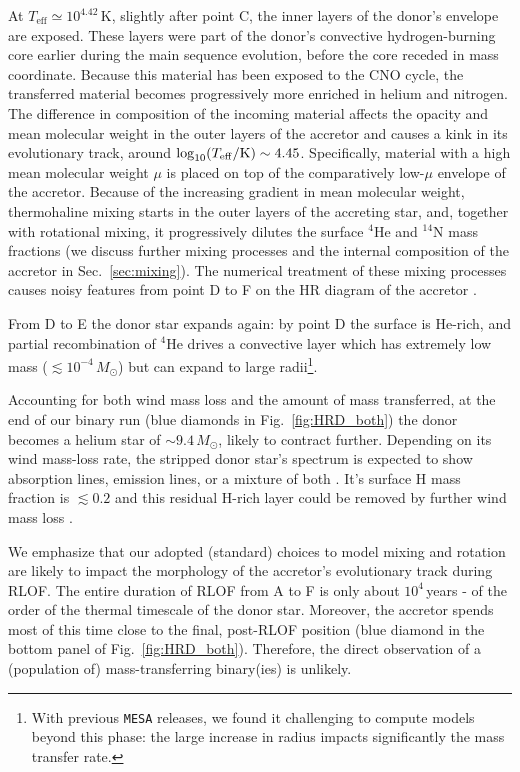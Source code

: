 \documentclass[twocolumn,twocolappendix,trackchanges]{aastex63}
\DeclareRobustCommand{\Figref}[1]{Fig.~\ref{#1}}
\DeclareRobustCommand{\Secref}[1]{Sec.~\ref{#1}}
\begin{document}
At $T_\mathrm{eff}\simeq 10^{4.42}$\,K, slightly after point C, the
inner layers of the donor's envelope are exposed. These layers were
part of the donor's convective hydrogen-burning core earlier during the main sequence evolution, before the core receded in mass
coordinate. Because this material has been exposed to the CNO cycle, the transferred material becomes progressively
more enriched in helium and nitrogen. The difference in composition of the
incoming material affects the opacity and mean molecular weight in the
outer layers of the accretor and causes a kink in its evolutionary
track, around $\log_{10} (T_{\rm eff}/\mathrm{K}) \sim 4.45$. Specifically, material with a high mean molecular weight $\mu$
is placed on top of the comparatively low-$\mu$ envelope of
the accretor.
Because of the increasing gradient in mean molecular weight,
thermohaline mixing starts in the outer layers of the accreting star,
and, together with rotational mixing, it progressively dilutes the
surface $^4\mathrm{He}$ and $^{14}\mathrm{N}$ mass fractions (we
discuss further mixing processes and the internal composition of the
accretor in \Secref{sec:mixing}). The numerical treatment of these
mixing processes causes noisy features from point D
to F on the HR diagram of the accretor \citep[e.g.,][]{cantiello:07}.

From D to E the donor star expands again: by point D the surface is He-rich, and partial
recombination of $^4\mathrm{He}$ drives a convective layer which has extremely low mass ($\lesssim 10^{-4}\,M_\odot$) but can expand to large radii\footnote{With previous \texttt{MESA} releases, we found it
  challenging to compute models beyond this phase: the large
  increase in radius impacts significantly the mass transfer rate.}.


Accounting for both wind mass loss and the amount of mass transferred,
at the end of our binary run (blue diamonds in \Figref{fig:HRD_both})
the donor becomes a helium star of $\sim 9.4\,M_\odot$, likely to
contract further. Depending on its wind mass-loss rate, the stripped
donor star's spectrum is expected to show absorption lines, emission lines, or a
mixture of both \citep[e.g.,][]{crowther:07, massey:14, neugent:17,
  gotberg:18, shenar:20}. It's surface H mass fraction is $\lesssim 0.2$ and
this residual H-rich layer could be removed by further wind
mass loss \citep[e.g.,][]{yoon:17, gotberg:17, laplace:20}.


We emphasize that our adopted (standard) choices to model mixing and
rotation are likely to impact the morphology of the accretor's
evolutionary track during RLOF. The entire duration of RLOF from A to
F is only about $10^4$\,years - of the order of the thermal timescale
of the donor star. Moreover, the accretor spends most of this time
close to the final, post-RLOF position (blue diamond in the bottom
panel of \Figref{fig:HRD_both}). Therefore, the direct observation of
a (population of) mass-transferring binary(ies) is unlikely.
\end{document}
